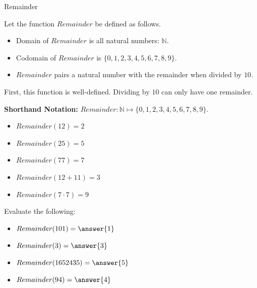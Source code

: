 \documentclass{ximera}
\begin{document}
\begin{example} Remainder 

Let the function $Remainder$ be defined as follows.


\begin{itemize}
\item Domain of $Remainder$ is all natural numbers: $\mathbb{N}$.
\item Codomain of $Remainder$ is $\{ 0, 1, 2, 3, 4, 5, 6, 7, 8, 9 \}$.
\item $Remainder$ pairs a natural number with the remainder when divided by $10$.
\end{itemize}


First, this function is well-defined. Dividing by $10$ can only have one remainder.


\textbf{Shorthand Notation: } $Remainder: \mathbb{N} \mapsto \{ 0, 1, 2, 3, 4, 5, 6, 7, 8, 9 \}$.





\begin{itemize}
	\item $Remainder(12) = 2$
	\item $Remainder(25) = 5$
	\item $Remainder(77) = 7$
	\item $Remainder(12 + 11) = 3$
	\item $Remainder(7 \cdot 7) = 9$
\end{itemize}









\begin{question}
Evaluate the following:

\begin{itemize}
	\item $Remainder(101) = \answer{1}$
	\item $Remainder(3) = \answer{3}$
	\item $Remainder(1652435) = \answer{5}$
	\item $Remainder(94) = \answer{4}$
\end{itemize}

\end{question}



\end{example}
\end{document}

